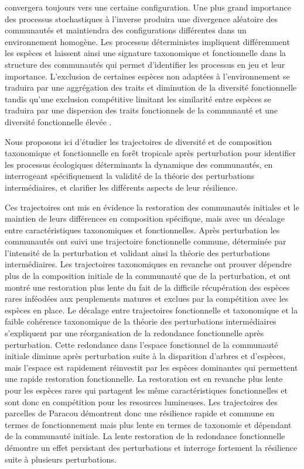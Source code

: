 \documentclass[
  11pt,
  french,
  A4paper,
  extrafontsizes,onecolumn,openright
  ]{memoir}
\begin{document}
convergera toujours vers une certaine configuration. Une plus grand
importance des processus stochastiques à l'inverse produira une
divergence aléatoire des communautés et maintiendra des configurations
différentes dans un environnement homogène. Les processus déterministes
impliquent différemment les espèces et laissent ainsi une signature
taxonomique et fonctionnelle dans la structure des communautés
\autocite{Funk2017} qui permet d'identifier les processus en jeu et leur
importance. L'exclusion de certaines espèces non adaptées à
l'environnement se traduira par une aggrégation des traits et diminution
de la diversité fonctionnelle tandis qu'une exclusion compétitive
limitant les similarité entre espèces se traduira par une dispersion des
traits fonctionnels de la communauté et une diversité fonctionnelle
élevée \autocites{McGill2006}{Kunstler2012}.

Nous proposons ici d'étudier les trajectoires de diversité et de
composition taxonomique et fonctionnelle en forêt tropicale après
perturbation pour identifier les processus écologiques déterminants la
dynamique des communautés, en interrogeant spécifiquement la validité de
la théorie des perturbations intermédiaires, et clarifier les différents
aspects de leur résilience.

Ces trajectoires ont mis en évidence la restoration des communautés
initiales et le maintien de leurs différences en composition spécifique,
mais avec un décalage entre caractéristiques taxonomiques et
fonctionnelles. Après perturbation les communautés ont suivi une
trajectoire fonctionnelle commune, déterminée par l'intensité de la
perturbation et validant ainsi la théorie des perturbations
intermédiaires. Les trajectoires taxonomiques en revanche ont prouver
dépendre plus de la composition initiale de la communauté que de la
perturbation, et ont montré une restoration plus lente du fait de la
difficile récupération des espèces rares inféodées aux peuplements
matures et exclues par la compétition avec les espèces en place. Le
décalage entre trajectoires fonctionnelle et taxonomique et la faible
cohérence taxonomique de la théorie des perturbations intermédiaires
s'expliquent par une réorganisation de la redondance fonctionnelle après
perturbation. Cette redondance dans l'espace fonctionnel de la
communauté initiale diminue après perturbation suite à la disparition
d'arbres et d'espèces, mais l'espace est rapidement réinvestit par les
espèces dominantes qui permettent une rapide restoration fonctionnelle.
La restoration est en revanche plus lente pour les espèces rares qui
partagent les même caractéristiques fonctionnelles et sont donc en
compétition pour les resources lumineuses. Les trajectoires des
parcelles de Paracou démontrent donc une résilience rapide et commune en
termes de fonctionnement mais plus lente en termes de taxonomie et
dépendant de la communauté initiale. La lente restoration de la
redondance fonctionnelle démontre un effet persistant des perturbations
et interroge fortement la résilience suite à plusieurs perturbations.
\end{document}
